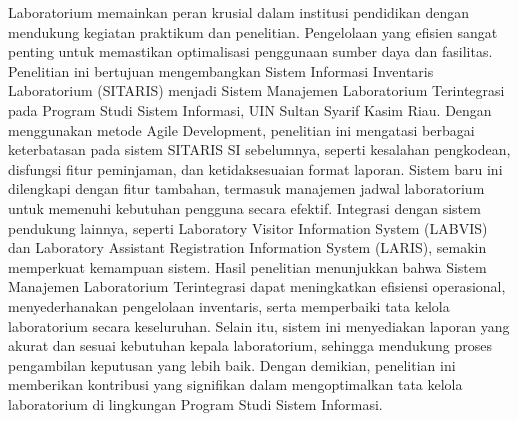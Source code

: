 \noindent
\fontsize{10pt}{12pt}\selectfont
Laboratorium memainkan peran krusial dalam institusi pendidikan dengan mendukung kegiatan praktikum dan penelitian. Pengelolaan yang efisien sangat penting untuk memastikan optimalisasi penggunaan sumber daya dan fasilitas. Penelitian ini bertujuan mengembangkan Sistem Informasi Inventaris Laboratorium (SITARIS) menjadi Sistem Manajemen Laboratorium Terintegrasi pada Program Studi Sistem Informasi, UIN Sultan Syarif Kasim Riau. Dengan menggunakan metode Agile Development, penelitian ini mengatasi berbagai keterbatasan pada sistem SITARIS SI sebelumnya, seperti kesalahan pengkodean, disfungsi fitur peminjaman, dan ketidaksesuaian format laporan. Sistem baru ini dilengkapi dengan fitur tambahan, termasuk manajemen jadwal laboratorium untuk memenuhi kebutuhan pengguna secara efektif. Integrasi dengan sistem pendukung lainnya, seperti Laboratory Visitor Information System (LABVIS) dan Laboratory Assistant Registration Information System (LARIS), semakin memperkuat kemampuan sistem. Hasil penelitian menunjukkan bahwa Sistem Manajemen Laboratorium Terintegrasi dapat meningkatkan efisiensi operasional, menyederhanakan pengelolaan inventaris, serta memperbaiki tata kelola laboratorium secara keseluruhan. Selain itu, sistem ini menyediakan laporan yang akurat dan sesuai kebutuhan kepala laboratorium, sehingga mendukung proses pengambilan keputusan yang lebih baik. Dengan demikian, penelitian ini memberikan kontribusi yang signifikan dalam mengoptimalkan tata kelola laboratorium di lingkungan Program Studi Sistem Informasi.\\
 \\